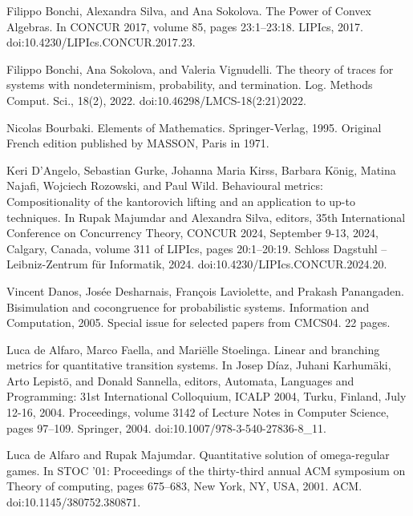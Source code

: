 \documentclass[10pt,a4paper]{article}
\begin{document}
\par\noindent  [13]  Filippo Bonchi, Alexandra Silva, and Ana Sokolova.  The Power of Convex Algebras.  In CONCUR 2017, volume 85, pages 23:1–23:18. LIPIcs, 2017.  doi:10.4230/LIPIcs.CONCUR.2017.23.  
 
\par\noindent  [14]  Filippo Bonchi, Ana Sokolova, and Valeria Vignudelli.  The theory of traces for systems with nondeterminism, probability, and termination.  Log. Methods Comput. Sci., 18(2), 2022.  doi:10.46298/LMCS-18(2:21)2022.  
 
\par\noindent  [15]  Nicolas Bourbaki.  Elements of Mathematics.  Springer-Verlag, 1995.  Original French edition published by MASSON, Paris in 1971.  
 
\par\noindent  [16]  Keri D’Angelo, Sebastian Gurke, Johanna Maria Kirss, Barbara König, Matina Najafi, Wojciech Rozowski, and Paul Wild.  Behavioural metrics: Compositionality of the kantorovich lifting and an application to up-to techniques.  In Rupak Majumdar and Alexandra Silva, editors, 35th International Conference on Concurrency Theory, CONCUR 2024, September 9-13, 2024, Calgary, Canada, volume 311 of LIPIcs, pages 20:1–20:19. Schloss Dagstuhl – Leibniz-Zentrum für Informatik, 2024.  doi:10.4230/LIPIcs.CONCUR.2024.20.  
 
\par\noindent  [17]  Vincent Danos, Josée Desharnais, François Laviolette, and Prakash Panangaden.  Bisimulation and cocongruence for probabilistic systems.  Information and Computation, 2005.  Special issue for selected papers from CMCS04. 22 pages.  
 
\par\noindent  [18]  Luca de Alfaro, Marco Faella, and Mariëlle Stoelinga.  Linear and branching metrics for quantitative transition systems.  In Josep Díaz, Juhani Karhumäki, Arto Lepistö, and Donald Sannella, editors, Automata, Languages and Programming: 31st International Colloquium, ICALP 2004, Turku, Finland, July 12-16, 2004. Proceedings, volume 3142 of Lecture Notes in Computer Science, pages 97–109. Springer, 2004.  doi:10.1007/978-3-540-27836-8\_11.  
 
\par\noindent  [19]  Luca de Alfaro and Rupak Majumdar.  Quantitative solution of omega-regular games.  In STOC ’01: Proceedings of the thirty-third annual ACM symposium on Theory of computing, pages 675–683, New York, NY, USA, 2001. ACM.  doi:10.1145/380752.380871.  
 
\end{document}
